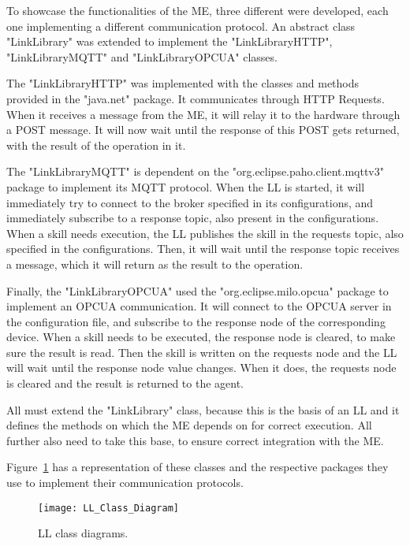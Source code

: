 To showcase the functionalities of the \acrshort{ME}, three different  were developed, each one implementing a different communication protocol. An abstract class "LinkLibrary" was extended to implement the "LinkLibraryHTTP", "LinkLibraryMQTT" and "LinkLibraryOPCUA" classes.

The "LinkLibraryHTTP" was implemented with the classes and methods provided in the "java.net" package. It communicates through \acrshort{HTTP} Requests. When it receives a message from the \acrshort{ME}, it will relay it to the hardware through a POST message. It will now wait until the response of this POST gets returned, with the result of the operation in it.

The "LinkLibraryMQTT" is dependent on the "org.eclipse.paho.client.mqttv3" package to implement its \acrshort{MQTT} protocol. When the \acrshort{LL} is started, it will immediately try to connect to the broker specified in its configurations, and immediately subscribe to a response topic, also present in the configurations. When a skill needs execution, the \acrshort{LL} publishes the skill in the requests topic, also specified in the configurations. Then, it will wait until the response topic receives a message, which it will return as the result to the operation.

Finally, the "LinkLibraryOPCUA" used the "org.eclipse.milo.opcua" package to implement an \acrshort{OPCUA} communication. It will connect to the \acrshort{OPCUA} server in the configuration file, and subscribe to the response node of the corresponding device. When a skill needs to be executed, the response node is cleared, to make sure the result is read. Then the skill is written on the requests node and the \acrshort{LL} will wait until the response node value changes. When it does, the requests node is cleared and the result is returned to the agent.

All  must extend the "LinkLibrary" class, because this is the basis of an \acrshort{LL} and it defines the methods on which the \acrlong{ME} depends on for correct execution. All further  also need to take this base, to ensure correct integration with the \acrshort{ME}.

Figure~\ref{fig:link_library_class_diagram} has a representation of these classes and the respective packages they use to implement their communication protocols.\\

\begin{figure}[h!]
	\centering
	\texttt{[image: LL\_Class\_Diagram]}
	\caption{\acrlong{LL} class diagrams.}
	\label{fig:link_library_class_diagram}
\end{figure}

